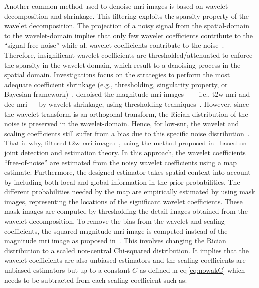 Another common method used to denoise \ac{mri} images is based on wavelet decomposition and shrinkage.
This filtering exploits the sparsity property of the wavelet decomposition.
The projection of a noisy signal from the spatial-domain to the wavelet-domain implies that only few wavelet coefficients contribute to the ``signal-free noise'' while all wavelet coefficients contribute to the noise~\cite{Donoho1994}.
Therefore, insignificant wavelet coefficients are thresholded/attenuated to enforce the sparsity in the wavelet-domain, which result to a denoising process in the spatial domain.
Investigations focus on the strategies to perform the most adequate coefficient shrinkage (e.g., thresholding, singularity property, or Bayesian framework)~\cite{Pizurica2002}.
\citeauthor{Ampeliotis2008} denoised the magnitude \ac{mri} images~\cite{Ampeliotis2007,Ampeliotis2008} --- i.e., \ac{t2w}-\ac{mri} and \ac{dce}-\ac{mri} --- by wavelet shrinkage, using thresholding techniques~\cite{Mallat2008}.
However, since the wavelet transform is an orthogonal transform, the Rician distribution of the noise is preserved in the wavelet-domain.
Hence, for low-\ac{snr}, the wavelet and scaling coefficients still suffer from a bias due to this specific noise distribution~\cite{Nowak1999}.
That is why, \citeauthor{Lopes2011} filtered \ac{t2w}-\ac{mri} images~\cite{Lopes2011}, using the method proposed in~\cite{Pizurica2003} based on joint detection and estimation theory.
In this approach, the wavelet coefficients ``free-of-noise'' are estimated from the noisy wavelet coefficients using a \ac{map} estimate.
Furthermore, the designed estimator takes spatial context into account by including both local and global information in the prior probabilities.
The different probabilities needed by the \ac{map} are empirically estimated by using mask images, representing the locations of the significant wavelet coefficients.
These mask images are computed by thresholding the detail images obtained from the wavelet decomposition.
To remove the bias from the wavelet and scaling coefficients, the squared magnitude \ac{mri} image is computed instead of the magnitude \ac{mri} image as proposed in~\cite{Nowak1999}.
This involves changing the Rician distribution to a scaled non-central Chi-squared distribution.
It implies that the wavelet coefficients are also unbiased estimators and the scaling coefficients are unbiased estimators but up to a constant $C$ as defined in \acs{eq}\,\eqref{eq:nowakC} which needs to be subtracted from each scaling coefficient such as:

